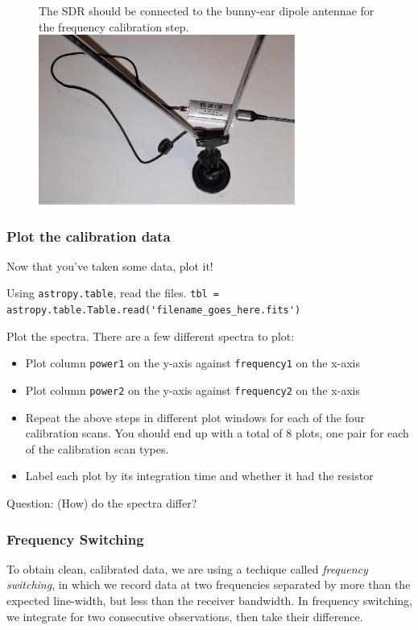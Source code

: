 \documentclass[11pt]{article}
\begin{document}
\begin{figure}[htp]
    \centering
    The SDR should be connected to the bunny-ear dipole antennae for the frequency calibration step.\\
\includegraphics[width=0.75\textwidth]{RadioLabPhotos/sdr_to_bunnyears.jpg}
\end{figure}


\subsubsection{Plot the calibration data}
Now that you've taken some data, plot it!

Using \texttt{astropy.table}, read the files.
\verb|tbl = astropy.table.Table.read('filename_goes_here.fits')|

Plot the spectra.  There are a few different spectra to plot:
\begin{itemize}
    \item Plot column \verb|power1| on the y-axis against \verb|frequency1| on the x-axis
    \item Plot column \verb|power2| on the y-axis against \verb|frequency2| on the x-axis
    \item Repeat the above steps in different plot windows for each of the four
        calibration scans.  You should end up with a total of 8 plots, one pair for
        each of the calibration scan types.
    \item Label each plot by its integration time and whether it had the resistor
\end{itemize}

Question: (How) do the spectra differ?

\subsubsection{Frequency Switching}
\label{sec:fsw}
To obtain clean, calibrated data, we are using a techique called \emph{frequency switching},
in which we record data at two frequencies separated by more than the expected line-width,
but less than the receiver bandwidth.  In frequency switching, we integrate for two consecutive
observations, then take their difference.
\end{document}
